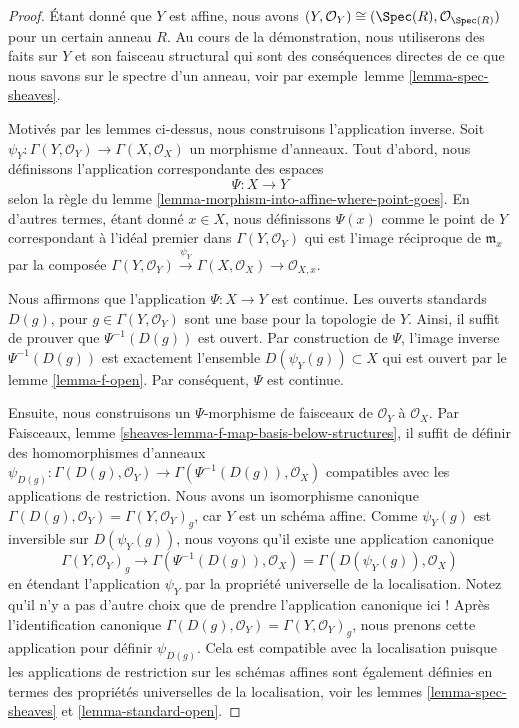 \begin{proof}
Étant donné que $Y$ est affine,
nous avons $(Y, \mathcal{O}_Y) \cong (\Spec(R), \mathcal{O}_{\Spec(R)})$ pour
un certain anneau $R$.
Au cours de la démonstration, nous utiliserons des faits
sur $Y$ et son faisceau structural qui sont des conséquences directes de ce
que nous savons sur le spectre d'un anneau, voir par exemple\ 
lemme \ref{lemma-spec-sheaves}.

\medskip\noindent
Motivés par les lemmes ci-dessus, nous construisons l'application inverse.
Soit $\psi_Y : \Gamma(Y, \mathcal{O}_Y) \to \Gamma(X, \mathcal{O}_X)$ un morphisme
d'anneaux. Tout d'abord, nous définissons l'application correspondante des
espaces
$$
\Psi : X \longrightarrow Y
$$
selon la règle
du lemme \ref{lemma-morphism-into-affine-where-point-goes}. En
d'autres termes, étant donné $x \in X$, nous définissons
$\Psi(x)$ comme le point de $Y$ correspondant à l'idéal
premier dans $\Gamma(Y, \mathcal{O}_Y)$ qui est
l'image réciproque de $\mathfrak m_x$ par la composée
$
\Gamma(Y, \mathcal{O}_Y) \xrightarrow{\psi_Y}
\Gamma(X, \mathcal{O}_X) \to
\mathcal{O}_{X, x}
$.

\medskip\noindent
Nous affirmons que l'application $\Psi : X \to Y$ est continue.
Les ouverts standards $D(g)$, pour $g \in \Gamma(Y, \mathcal{O}_Y)$
sont une base pour la topologie de $Y$. Ainsi, il suffit de prouver
que $\Psi^{-1}(D(g))$ est ouvert. Par construction de $\Psi$,
l'image inverse $\Psi^{-1}(D(g))$ est exactement l'ensemble
$D(\psi_Y(g)) \subset X$ qui est ouvert par le lemme \ref{lemma-f-open}. Par
conséquent, $\Psi$ est continue.

\medskip\noindent
Ensuite, nous construisons un $\Psi$-morphisme de
faisceaux de $\mathcal{O}_Y$ à $\mathcal{O}_X$.
Par Faisceaux, lemme \ref{sheaves-lemma-f-map-basis-below-structures}, il
suffit de définir des homomorphismes
d'anneaux $\psi_{D(g)} : \Gamma(D(g), \mathcal{O}_Y)
\to \Gamma(\Psi^{-1}(D(g)), \mathcal{O}_X)$
compatibles avec les applications de
restriction. Nous avons un isomorphisme
canonique $\Gamma(D(g), \mathcal{O}_Y) = \Gamma(Y, \mathcal{O}_Y)_g$,
car $Y$ est un schéma affine. Comme
$\psi_Y(g)$ est inversible sur $D(\psi_Y(g))$, nous voyons
qu'il existe une application canonique
$$
\Gamma(Y, \mathcal{O}_Y)_g
\longrightarrow
\Gamma(\Psi^{-1}(D(g)), \mathcal{O}_X)
=
\Gamma(D(\psi_Y(g)), \mathcal{O}_X)
$$
en étendant l'application $\psi_Y$
par la propriété universelle de la localisation.
Notez qu'il n'y a pas d'autre choix que de prendre l'application canonique
ici ! Après l'identification
canonique $\Gamma(D(g), \mathcal{O}_Y)
= \Gamma(Y, \mathcal{O}_Y)_g$, nous prenons cette application pour
définir $\psi_{D(g)}$. Cela est compatible avec la localisation puisque les
applications de restriction sur les schémas affines sont également
définies en termes des propriétés universelles de la localisation,
voir les lemmes \ref{lemma-spec-sheaves} et \ref{lemma-standard-open}.


\end{proof}
